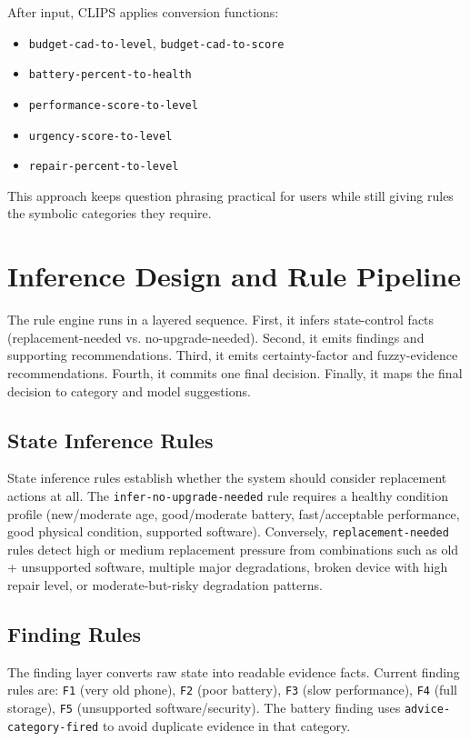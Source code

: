 \documentclass[11pt]{article}
\begin{document}
After input, CLIPS applies conversion functions:
\begin{itemize}
  \item \texttt{budget-cad-to-level}, \texttt{budget-cad-to-score}
  \item \texttt{battery-percent-to-health}
  \item \texttt{performance-score-to-level}
  \item \texttt{urgency-score-to-level}
  \item \texttt{repair-percent-to-level}
\end{itemize}

This approach keeps question phrasing practical for users while still giving rules the symbolic categories they require.

\section{Inference Design and Rule Pipeline}
The rule engine runs in a layered sequence. First, it infers state-control facts (replacement-needed vs. no-upgrade-needed). Second, it emits findings and supporting recommendations. Third, it emits certainty-factor and fuzzy-evidence recommendations. Fourth, it commits one final decision. Finally, it maps the final decision to category and model suggestions.

\subsection{State Inference Rules}
State inference rules establish whether the system should consider replacement actions at all. The \texttt{infer-no-upgrade-needed} rule requires a healthy condition profile (new/moderate age, good/moderate battery, fast/acceptable performance, good physical condition, supported software). Conversely, \texttt{replacement-needed} rules detect high or medium replacement pressure from combinations such as old + unsupported software, multiple major degradations, broken device with high repair level, or moderate-but-risky degradation patterns.

\subsection{Finding Rules}
The finding layer converts raw state into readable evidence facts. Current finding rules are:
\texttt{F1} (very old phone), \texttt{F2} (poor battery), \texttt{F3} (slow performance), \texttt{F4} (full storage), \texttt{F5} (unsupported software/security). The battery finding uses \texttt{advice-category-fired} to avoid duplicate evidence in that category.
\end{document}

